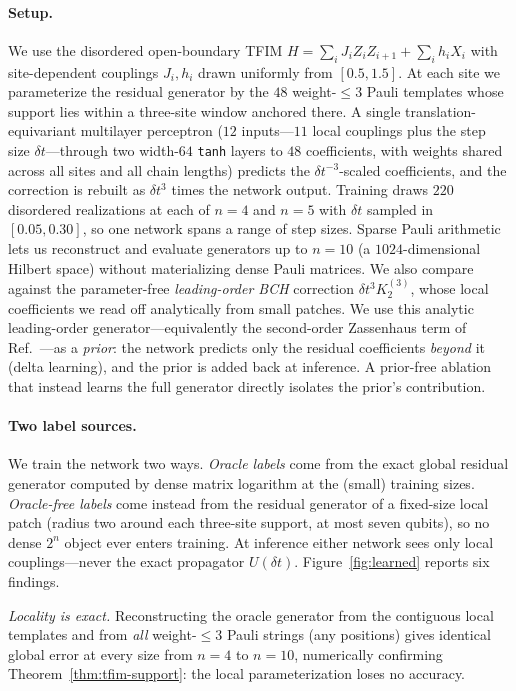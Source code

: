 \documentclass[aps,prresearch,reprint,superscriptaddress,nofootinbib,amsmath,amssymb]{revtex4-2}
\newcommand{\tfim}{TFIM}
\newcommand{\dt}{\delta t}
\begin{document}
\paragraph{Setup.} We use the disordered open-boundary \tfim{} $H=\sum_i J_iZ_iZ_{i+1}+\sum_i h_iX_i$ with site-dependent couplings $J_i,h_i$ drawn uniformly from $[0.5,1.5]$. At each site we parameterize the residual generator by the $48$ weight-$\leq3$ Pauli templates whose support lies within a three-site window anchored there. A single translation-equivariant multilayer perceptron ($12$ inputs---$11$ local couplings plus the step size $\dt$---through two width-$64$ \texttt{tanh} layers to $48$ coefficients, with weights shared across all sites and all chain lengths) predicts the $\dt^{-3}$-scaled coefficients, and the correction is rebuilt as $\dt^3$ times the network output. Training draws $220$ disordered realizations at each of $n=4$ and $n=5$ with $\dt$ sampled in $[0.05,0.30]$, so one network spans a range of step sizes. Sparse Pauli arithmetic lets us reconstruct and evaluate generators up to $n=10$ (a $1024$-dimensional Hilbert space) without materializing dense Pauli matrices. We also compare against the parameter-free \emph{leading-order BCH} correction $\dt^3K_2^{(3)}$, whose local coefficients we read off analytically from small patches. We use this analytic leading-order generator---equivalently the second-order Zassenhaus term of Ref.~\cite{nguyen2025zassenhaus}---as a \emph{prior}: the network predicts only the residual coefficients \emph{beyond} it (delta learning), and the prior is added back at inference. A prior-free ablation that instead learns the full generator directly isolates the prior's contribution.

\paragraph{Two label sources.} We train the network two ways. \emph{Oracle labels} come from the exact global residual generator computed by dense matrix logarithm at the (small) training sizes. \emph{Oracle-free labels} come instead from the residual generator of a fixed-size local patch (radius two around each three-site support, at most seven qubits), so no dense $2^n$ object ever enters training. At inference either network sees only local couplings---never the exact propagator $U(\dt)$. Figure~\ref{fig:learned} reports six findings.

\emph{Locality is exact.} Reconstructing the oracle generator from the contiguous local templates and from \emph{all} weight-$\leq3$ Pauli strings (any positions) gives identical global error at every size from $n=4$ to $n=10$, numerically confirming Theorem~\ref{thm:tfim-support}: the local parameterization loses no accuracy.
\end{document}
